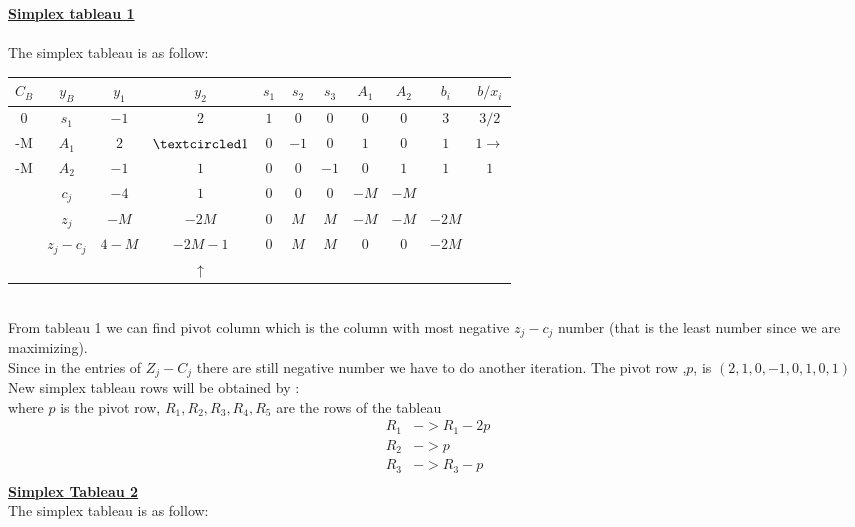 \documentclass[12pt,a4paper]{article}
\begin{document}
		\underline{\textbf{Simplex tableau 1}}\\\\
		The simplex tableau is as follow: \\
		
		\begin{tabular}{cc|ccccccc|cc}
			\hline 
			$C_B$& $y_B $&$ y_1$ & $y_2$ & $s_1$ & $s_2$ & $s_3$ & $A_1$ & $A_2$ & $b_i$ & $b/x_i$ \\ 
			\hline 
		  0  &  $s_1$ & $-1$ & $2$ & $1$ & $0$ & $0$ & $0$ & $0$ &$3$ & $3/2$\\ 
		  -M &  $A_1$ & $2$ & $\textcircled 1$ & $0$ & $-1$ & $0$ & $1$ & $0$ & $1$& $1\rightarrow$\\ 
			-M &  $A_2$ & $-1$ & $1$ & $0$ & $0$ & $-1$ & $0$ & $1$ & $1$ & $1$ \\ 
			\hline 
			& $ c_j$ & $-4$ & $1$ & $0$ & $0$ & $0$ & $-M$ & $-M$ &  & \\ 
			\hline
			& $ z_j$ & $-M$ & $-2M$ & $0$ & $M$ & $M$ & $-M$ & $-M$ & $-2M$ & \\ 
			\hline 
			&  $z_j-c_j$& $4-M$ & $-2M-1$ & $0$ & $M$ & $M$ & $0$ & $0$ & $-2M$ &\\ 
			\hline 
			&  &  & $\uparrow$ &  &  &  &  &  &  & \\ 
		\end{tabular} \\
		From tableau 1 we can find pivot column which is the column with most negative $z_j-c_j$ number (that is the least number since we are maximizing). \\
		Since in the entries of $Z_j-C_j$ there are still negative number we have to do another iteration.
			The pivot row ,$p$, is $( 2,1,0,-1, 0 , 1 , 0,1)$\\
			New simplex tableau rows will be obtained by :\\
			where $p$ is the pivot row, $R_1,R_2,R_3,R_4,R_5$ are the rows of the tableau
			\begin{align*}
			R_1 &-> R_1-2p\\
			R_2 &-> p\\
			R_3 &-> R_3 - p\\
			\end{align*}
		\textbf{\underline{Simplex Tableau 2}}\\
		The simplex tableau is as follow: \\
		
\end{document}
